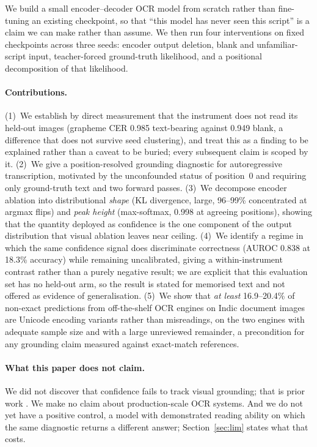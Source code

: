 \documentclass{article}
\begin{document}
We build a small encoder--decoder OCR model from scratch rather than fine-tuning an existing
checkpoint, so that ``this model has never seen this script'' is a claim we can make rather
than assume. We then run four interventions on fixed checkpoints across three seeds: encoder
output deletion, blank and unfamiliar-script input, teacher-forced ground-truth likelihood,
and a positional decomposition of that likelihood.

\paragraph{Contributions.}
(1)~We establish by direct measurement that the instrument does not read its held-out images
(grapheme CER 0.985 text-bearing against 0.949 blank, a difference that does not survive seed
clustering), and treat this as a finding to be explained rather than a caveat to be buried;
every subsequent claim is scoped by it.
(2)~We give a position-resolved grounding diagnostic for autoregressive transcription,
motivated by the unconfounded status of position~0 and requiring only ground-truth text and
two forward passes.
(3)~We decompose encoder ablation into distributional \emph{shape} (KL divergence, large,
96--99\% concentrated at argmax flips) and \emph{peak height} (max-softmax, 0.998 at agreeing
positions), showing that the quantity deployed as confidence is the one component of the
output distribution that visual ablation leaves near ceiling.
(4)~We identify a regime in which the same confidence signal does discriminate correctness
(AUROC 0.838 at 18.3\% accuracy) while remaining uncalibrated, giving a within-instrument
contrast rather than a purely negative result; we are explicit that this evaluation set has no
held-out arm, so the result is stated for memorised text and not offered as evidence of
generalisation.
(5)~We show that \emph{at least} 16.9--20.4\% of non-exact predictions from off-the-shelf OCR
engines on Indic document images are Unicode encoding variants rather than misreadings, on the two
engines with adequate sample size and with a large unreviewed remainder, a precondition for any
grounding claim measured against exact-match references.

\paragraph{What this paper does not claim.} We did not discover that confidence fails to track
visual grounding; that is prior work \citep{khanmohammadi2026bicr}. We make no claim about
production-scale OCR systems. And we do not yet have a positive control, a model with
demonstrated reading ability on which the same diagnostic returns a different answer;
Section~\ref{sec:lim} states what that costs.
\end{document}
